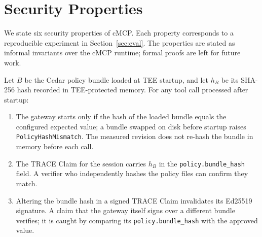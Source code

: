 \section{Security Properties}
\label{sec:claims}

We state six security properties of cMCP. Each property corresponds to a reproducible
experiment in Section~\ref{sec:eval}. The properties are stated as informal invariants
over the cMCP runtime; formal proofs are left for future work.

\begin{property}
\label{prop:policy-hash}
Let $B$ be the Cedar policy bundle loaded at TEE startup, and let $h_B$ be its
SHA-256 hash recorded in TEE-protected memory. For any tool call processed after startup:
\begin{enumerate}[leftmargin=1.5em,label=(\alph*)]
  \item The gateway starts only if the hash of the loaded bundle equals the configured
    expected value; a bundle swapped on disk before startup raises
    \texttt{PolicyHashMismatch}. The measured revision does not re-hash the bundle in
    memory before each call.
  \item The TRACE Claim for the session carries $h_B$ in the \texttt{policy.bundle\_hash}
    field. A verifier who independently hashes the policy files can confirm they match.
  \item Altering the bundle hash in a signed TRACE Claim invalidates its Ed25519
    signature. A claim that the gateway itself signs over a different bundle verifies; it
    is caught by comparing its \texttt{policy.bundle\_hash} with the approved value.
\end{enumerate}
\end{property}

